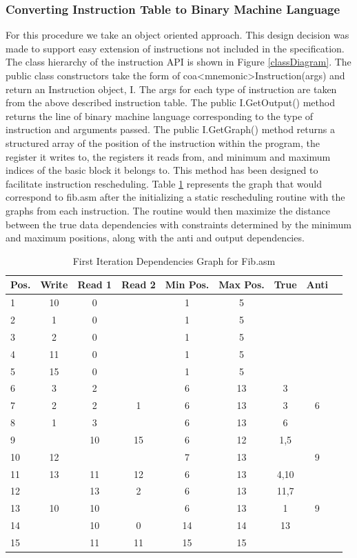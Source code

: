 \documentclass[conference]{IEEEtran}
\begin{document}
\subsubsection{Converting Instruction Table to Binary Machine Language}
For this procedure we take an object oriented approach. This design decision was made to support easy extension of instructions not included in the specification. The class hierarchy of the instruction API is shown in Figure \ref{classDiagram}. The public class constructors take the form of coa<mnemonic>Instruction(args) and return an Instruction object, I. The args for each type of instruction are taken from the above described instruction table. The public I.GetOutput() method returns the line of binary machine language corresponding to the type of instruction and arguments passed. The public I.GetGraph() method returns a structured array of the position of the instruction within the program, the register it writes to, the registers it reads from, and minimum and maximum indices of the basic block it belongs to. This method has been designed to facilitate instruction rescheduling. Table \ref{depGraph} represents the graph that would correspond to fib.asm after the initializing a static rescheduling routine with the graphs from each instruction. The routine would then maximize the distance between the true data dependencies with constraints determined by the minimum and maximum positions, along with the anti and output dependencies.

\begin{table}[h]
\caption{First Iteration Dependencies Graph for Fib.asm}
\label{depGraph}
\begin{tabularx}{\columnwidth}{@{}lcccccccc@{}}
\toprule
Pos. & Write & Read 1 & Read 2 & Min Pos. & Max Pos. & True & Anti \\ \midrule
1 & 10 & 0 &  & 1 & 5 &  &  \\
2 & 1 & 0 &  & 1 & 5 &  &  \\
3 & 2 & 0 &  & 1 & 5 &  &  \\
4 & 11 & 0 &  & 1 & 5 &  &  \\
5 & 15 & 0 &  & 1 & 5 &  &  \\
6 & 3 & 2 &  & 6 & 13 & 3 &  \\
7 & 2 & 2 & 1 & 6 & 13 & 3 & 6  \\
8 & 1 & 3 &  & 6 & 13 & 6 &  \\
9 &  & 10 & 15 & 6 & 12 & 1,5 &   \\
10 & 12 &  &  & 7 & 13 &   & 9\\
11 & 13 & 11 & 12 & 6 & 13 & 4,10 &  \\ 
12 &  & 13 & 2 & 6 & 13 & 11,7 &  \\
13 & 10 & 10 &  & 6 & 13 & 1 &  9\\
14 &  & 10 & 0 & 14 & 14 & 13 &  \\
15 &  & 11 & 11 & 15 & 15 &  &  \\ \bottomrule
\end{tabularx}
\end{table}
\end{document}

